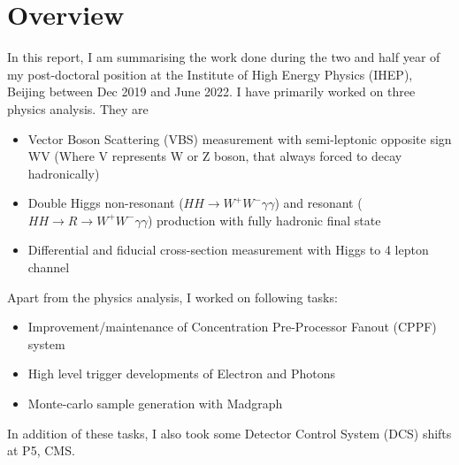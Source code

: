 \chapter{Overview}


In this report, I am summarising the work done during the two and half year of my post-doctoral position at the Institute of High Energy Physics (IHEP), Beijing between Dec 2019 and June 2022. I have primarily worked on three physics analysis. They are 
\begin{itemize}
    \item Vector Boson Scattering (VBS) measurement with semi-leptonic opposite sign WV (Where V represents W or Z boson, that always forced to decay hadronically)
    \item Double Higgs non-resonant ($HH \rightarrow W^+W^-\gamma\gamma$) and resonant ($HH \rightarrow R \rightarrow W^+W^-\gamma\gamma$) production with fully hadronic final state
    \item Differential and fiducial cross-section measurement with Higgs to 4 lepton channel
\end{itemize}
Apart from the physics analysis, I worked on following tasks:
\begin{itemize}
    \item Improvement/maintenance of Concentration Pre-Processor Fanout (CPPF) system
    \item High level trigger developments of Electron and Photons
    \item Monte-carlo sample generation with Madgraph
\end{itemize}
In addition of these tasks, I also took some Detector Control System (DCS) shifts at P5, CMS.


